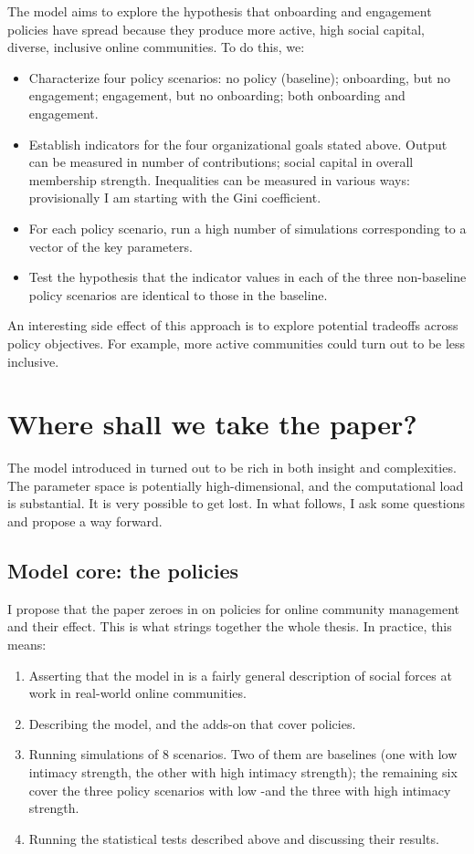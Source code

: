 \documentclass{article}
\begin{document}
The model aims to explore the hypothesis that onboarding and engagement policies have spread because they produce more active, high social capital, diverse, inclusive online communities. To do this, we:

\begin{itemize}
	\item Characterize four policy scenarios: no policy (baseline); onboarding, but no engagement; engagement, but no onboarding; both onboarding and engagement.
	\item Establish indicators for the four organizational goals stated above. Output can be measured in number of contributions; social capital in overall membership strength. Inequalities can be measured in various ways: provisionally I am starting with the Gini coefficient.
	\item For each policy scenario, run a high number of simulations corresponding to a vector of the key parameters.
	\item Test the hypothesis that the indicator values in each of the three non-baseline policy scenarios are identical to those in the baseline. 
\end{itemize}

An interesting side effect of this approach is to explore potential tradeoffs across policy objectives. For example, more active communities could turn out to be less inclusive. 

\section{Where shall we take the paper?}

The model introduced in \cite{kim2015group} turned out to be rich in both insight and complexities. The parameter space is potentially high-dimensional, and the computational load is substantial. It is very possible to get lost. In what follows, I ask some questions and propose a way forward.

\subsection{Model core: the policies}

I propose that the paper zeroes in on policies for online community management and their effect. This is what strings together the whole thesis. In practice, this means:

\begin{enumerate}
	\item Asserting that the model in \cite{kim2015group} is a fairly general description of social forces at work in real-world online communities.
	\item Describing the model, and the adds-on that cover policies.
	\item Running simulations of 8 scenarios. Two of them are baselines (one with low intimacy strength, the other with high intimacy strength); the remaining six cover the three policy scenarios with low -and the three with high intimacy strength.
	\item Running the statistical tests described above and discussing their results. 
\end{enumerate}
\end{document}
